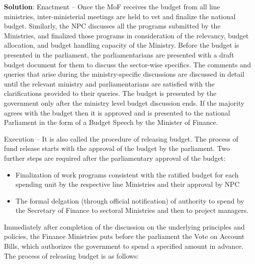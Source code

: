 \documentclass[
]{book}
\newenvironment{solution}{ {\bfseries Solution}:}{}
\begin{document}
\begin{questions}
\begin{solution}
Enactment -- Once the MoF receives the budget from all line ministries, inter-ministerial meetings are held to vet and finalize the national budget. Similarly, the NPC discusses all the programs submitted by the Ministries, and finalized those programs in consideration of the relevancy, budget allocation, and budget handling capacity of the Ministry. Before the budget is presented in the parliament, the parliamentarians are presented with a draft budget document for them to discuss the sector-wise specifics. The comments and queries that arise during the ministry-specific discussions are discussed in detail until the relevant ministry and parliamentarians are satisfied with the clarifications provided to their queries. The budget is presented by the government only after the ministry level budget discussion ends. If the majority agrees with the budget then it is approved and is presented to the national Parliament in the form of a Budget Speech by the Minister of Finance.

Execution -- It is also called the procedure of releasing budget. The process of fund release starts with the approval of the budget by the parliament. Two further steps are required after the parliamentary approval of the budget:

\begin{itemize}
\item Finalization of work programs consistent with the ratified budget for each spending unit by the respective line Ministries and their approval by NPC
\item The formal delgation (through official notification) of authority to spend by the Secretary of Finance to sectoral Ministries and then to project managers.
\end{itemize}

Immediately after completion of the discussion  on  the  underlying principles  and  policies,  the  Finance  Ministries  puts before the parliament the Vote on Account Bills, which authorizes the government to spend a specified amount in advance. The process of releasing budget is as follows:


\end{solution}
\end{questions}
\end{document}
